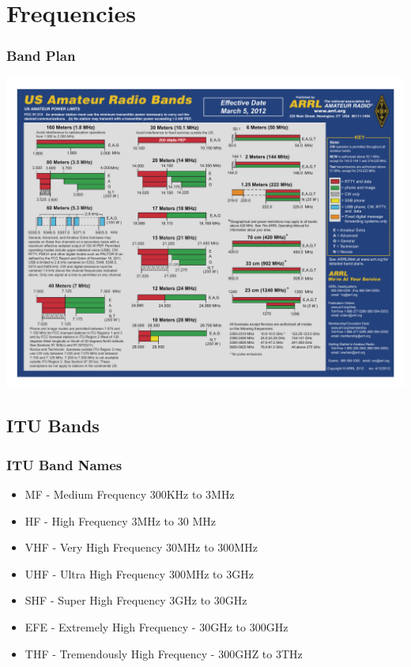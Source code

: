 \documentclass[10pt, handout]{beamer}
\begin{document}
\section{Frequencies}

\begin{frame}
\frametitle{Band Plan}
\begin{center}
\includegraphics[height=.9\textheight]{hambandscolor.pdf}
\end{center}
\end{frame}

\subsection{ITU Bands}

\begin{frame}
\frametitle{ITU Band Names}
\begin{itemize}
\item MF - Medium Frequency 300KHz to 3MHz
\item HF - High Frequency 3MHz to 30 MHz
\item VHF - Very High Frequency 30MHz to 300MHz
\item UHF - Ultra High Frequency 300MHz to 3GHz
\item SHF - Super High Frequency 3GHz to 30GHz
\item EFE - Extremely High Frequency - 30GHz to 300GHz
\item THF - Tremendously High Frequency - 300GHZ to 3THz
\end{itemize}
\end{frame}
\end{document}
